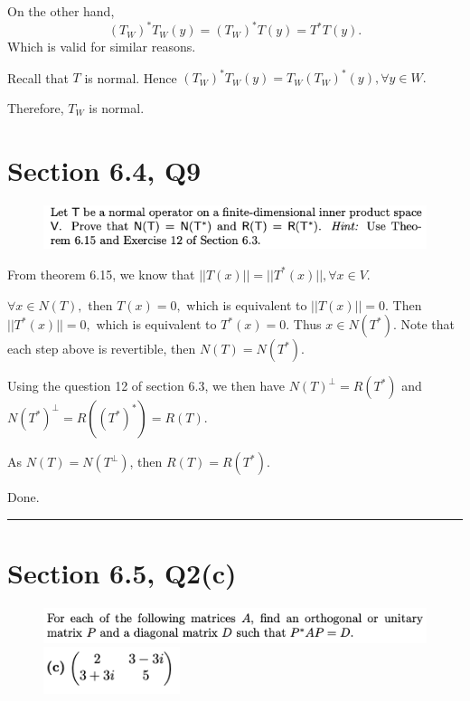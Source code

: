 \documentclass[12pt]{article}%
\begin{document}
On the other hand, $$(T_W)^*T_W(y)=(T_W)^*T(y)=T^*T(y).$$ Which is valid for similar reasons.

Recall that $T$ is normal. Hence $(T_W)^*T_W(y)=T_W (T_W)^* (y), \forall y \in W.$

Therefore, $T_W$ is normal.


\newpage

\section{Section 6.4, Q9}
\begin{figure}[htp]
    \centering %
    \includegraphics[width = 16cm]{img/Q7.png}
\end{figure}

From theorem 6.15, we know that $||T(x)||=||T^*(x)||, \forall x \in V.$

$\forall x \in N(T),$ then $T(x)=0,$ which is equivalent to $||T(x)||=0.$
Then $||T^*(x)||=0,$ which is equivalent to $T^*(x)=0.$ Thus $x \in N(T^*).$ 
Note that each step above is revertible, then $N(T)=N(T^*).$

Using the question 12 of section 6.3, we then have $N(T)^{\perp}=R(T^*)$ and 
$N(T^*)^{\perp}=R((T^*)^*)=R(T).$ 

As $N(T)=N(T^{\perp})$, then $R(T)=R(T^*).$

Done.

\noindent\rule[0.1ex]{\linewidth}{1pt}


\section{Section 6.5, Q2(c)}
\begin{figure}[htp]
    \centering %
    \includegraphics[width = 16cm]{img/Q8a.png}
    \includegraphics[width = 4cm]{img/Q8b.png}
\end{figure}
\end{document}
